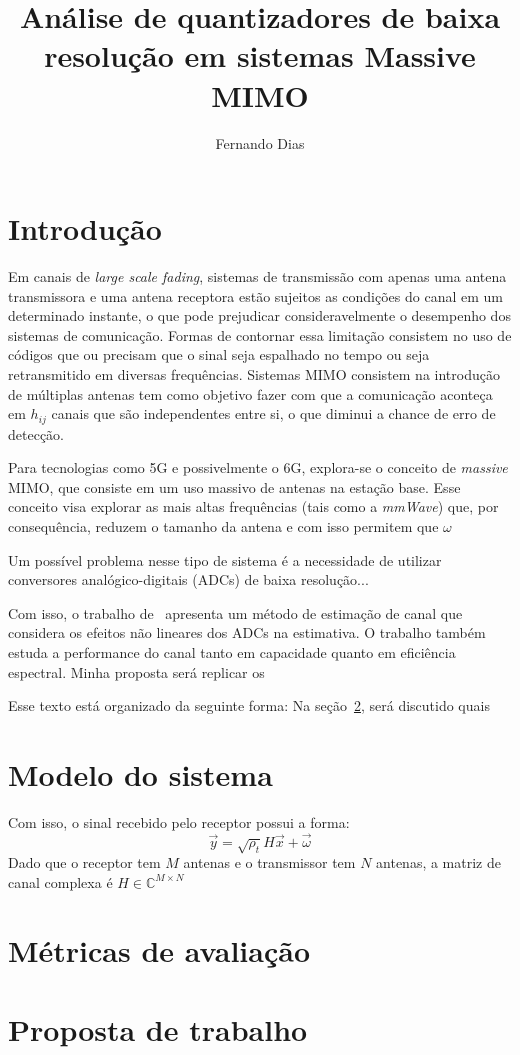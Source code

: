 \documentclass{article}
\title{Análise de quantizadores de baixa resolução em sistemas Massive MIMO}
\author{Fernando Dias}
\date{}
\begin{document}
	\maketitle
	
	\section{Introdução}
	Em canais de \textit{large scale fading}, sistemas de transmissão com apenas uma antena transmissora e uma antena receptora estão sujeitos as condições do canal em um determinado instante, o que pode prejudicar consideravelmente o desempenho dos sistemas de comunicação. Formas de contornar essa limitação consistem no uso de códigos que ou precisam que o sinal seja espalhado no tempo ou seja retransmitido em diversas frequências. Sistemas MIMO consistem na introdução de múltiplas antenas tem como objetivo fazer com que a comunicação aconteça em $h_{ij}$ canais que são independentes entre si, o que diminui a chance de erro de detecção. 

	Para tecnologias como 5G e possivelmente o 6G, explora-se o conceito de \textit{massive} MIMO, que consiste em um uso massivo de antenas na estação base. Esse conceito visa explorar as mais altas frequências (tais como a \textit{mmWave}) que, por consequência, reduzem o tamanho da antena e com isso permitem que $\omega$

	Um possível problema nesse tipo de sistema é a necessidade de utilizar conversores analógico-digitais (ADCs) de baixa resolução... 

	Com isso, o trabalho de~\cite{li.etal_2017a} apresenta um método de estimação de canal que considera os efeitos não lineares dos ADCs na estimativa. O trabalho também estuda a performance do canal tanto em capacidade quanto em eficiência espectral.
	Minha proposta será replicar os 

	Esse texto está organizado da seguinte forma:
	Na seção~\ref{sec:modelo_sistema}, será discutido quais  

	\section{Modelo do sistema}
	\label{sec:modelo_sistema}

	Com isso, o sinal recebido pelo receptor possui a forma:
	\begin{equation}
		\vec{y}=\sqrt{\rho_t}H\vec{x}+\vec{\omega}
		\label{eq:recepcao_sinal_mimo}
	\end{equation}
	Dado que o receptor tem $M$ antenas e o transmissor tem $N$ antenas, a matriz de canal complexa é $H\in\mathbb{C}^{M\times N}$
	

	\section{Métricas de avaliação}
	\label{sec:metricas_avaliacao}
		

	\section{Proposta de trabalho}
	\label{sec:proposta_trabalho}


	
	
\end{document}
